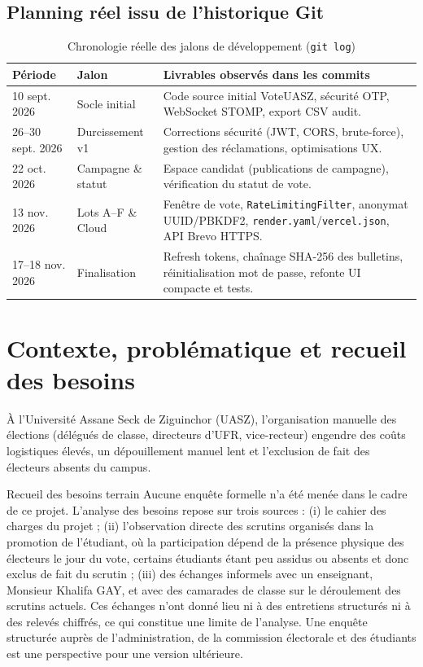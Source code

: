 \subsection{Planning réel issu de l'historique Git}
\begin{table}[H]
\centering
\caption{Chronologie réelle des jalons de développement (\texttt{git log})}
\label{tab:planning-git}
\small
\begin{tabularx}{\textwidth}{@{}llX@{}}
\toprule
\rowcolor{uaszlight}
\textbf{Période} & \textbf{Jalon} & \textbf{Livrables observés dans les commits} \\
\midrule
10 sept. 2026 & Socle initial & Code source initial VoteUASZ, sécurité OTP, WebSocket STOMP, export CSV audit. \\
26--30 sept. 2026 & Durcissement v1 & Corrections sécurité (JWT, CORS, brute-force), gestion des réclamations, optimisations UX. \\
22 oct. 2026 & Campagne \& statut & Espace candidat (publications de campagne), vérification du statut de vote. \\
13 nov. 2026 & Lots A--F \& Cloud & Fenêtre de vote, \texttt{RateLimitingFilter}, anonymat UUID/PBKDF2, \texttt{render.yaml}/\texttt{vercel.json}, API Brevo HTTPS. \\
17--18 nov. 2026 & Finalisation & Refresh tokens, chaînage SHA-256 des bulletins, réinitialisation mot de passe, refonte UI compacte et tests. \\
\bottomrule
\end{tabularx}
\end{table}

\section{Contexte, problématique et recueil des besoins}

À l'Université Assane Seck de Ziguinchor (UASZ), l'organisation manuelle des élections (délégués de classe, directeurs d'UFR, vice-recteur) engendre des coûts logistiques élevés, un dépouillement manuel lent et l'exclusion de fait des électeurs absents du campus.

\begin{uaszbox}{Recueil des besoins terrain}
Aucune enquête formelle n'a été menée dans le cadre de ce projet. L'analyse des besoins repose sur trois sources : (i) le cahier des charges du projet ; (ii) l'observation directe des scrutins organisés dans la promotion de l'étudiant, où la participation dépend de la présence physique des électeurs le jour du vote, certains étudiants étant peu assidus ou absents et donc exclus de fait du scrutin ; (iii) des échanges informels avec un enseignant, Monsieur Khalifa GAY, et avec des camarades de classe sur le déroulement des scrutins actuels. Ces échanges n'ont donné lieu ni à des entretiens structurés ni à des relevés chiffrés, ce qui constitue une limite de l'analyse. Une enquête structurée auprès de l'administration, de la commission électorale et des étudiants est une perspective pour une version ultérieure.
\end{uaszbox}

